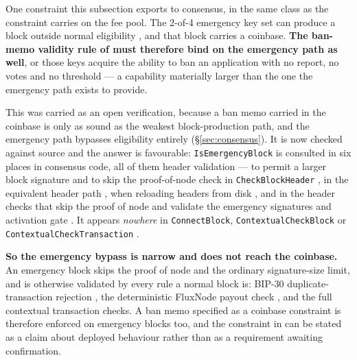 One constraint this subsection exports to consensus, in the same class as the constraint
 carries on the fee pool. The 2-of-4 emergency key set can produce a block outside
normal \PoN{} eligibility , and that block carries a
coinbase. \textbf{The ban-memo validity rule of  must therefore bind on the
emergency path as well}, or those keys acquire the ability to ban an application with no report,
no votes and no threshold --- a capability materially larger than the one the emergency path exists
to provide.

\begin{remark}
\label{rem:emergency-coinbase}
This was carried as an open verification, because a ban memo carried in the coinbase is only as
sound as the weakest block-production path, and the emergency path bypasses eligibility entirely
(\S\ref{sec:consensus}). It is now checked against source and the answer is favourable:
\texttt{Is\allowbreak{}Emergency\allowbreak{}Block} is consulted in six places in consensus code, all of them header
validation --- to permit a larger block signature and to skip the proof-of-node check in
\texttt{Check\allowbreak{}Block\allowbreak{}Header} , in the equivalent header path
, when reloading headers from disk
, and in the \PoN{} header checks that skip the proof of node and
validate the emergency signatures and activation gate .
It appears \emph{nowhere} in \texttt{ConnectBlock},
\texttt{Contextual\allowbreak{}Check\allowbreak{}Block} or \texttt{Contextual\allowbreak{}Check\allowbreak{}Transaction} \shipped.

\textbf{So the emergency bypass is narrow and does not reach the coinbase.} An emergency block skips
the proof of node and the ordinary signature-size limit, and is otherwise validated by every rule a
normal block is: BIP-30 duplicate-transaction rejection
, the deterministic FluxNode payout check
, and the full contextual transaction checks. A ban memo
specified as a coinbase constraint is therefore enforced on emergency blocks too, and the constraint
in  can be stated as a claim about deployed behaviour rather than as a
requirement awaiting confirmation.
\end{remark}

